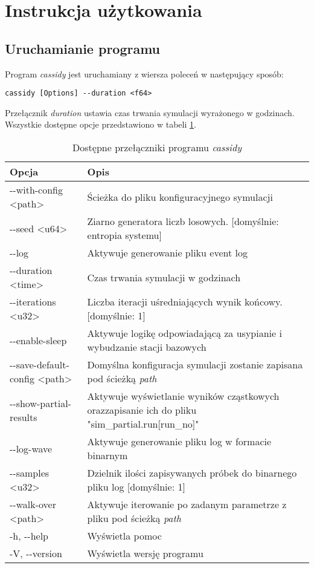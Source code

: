 \section{Instrukcja użytkowania}
\subsection{Uruchamianie programu}
Program \emph{cassidy} jest uruchamiany z wiersza poleceń w następujący sposób:
{
\selectfont 
\begin{verbatim}
cassidy [Options] --duration <f64>
\end{verbatim}
}

\noindent Przełącznik \emph{duration} ustawia czas trwania symulacji wyrażonego w godzinach. Wszystkie dostępne opcje przedstawiono w tabeli \ref{options_table}.
\newline\newline
\begin{table}[h]
\caption{Dostępne przełączniki programu \emph{cassidy}}
\label{options_table}
\begin{center}
\selectfont
\renewcommand{\arraystretch}{1.5}
\begin{tabular}{|l|p{}|}
\hline 
Opcja & Opis \\ 
\hline 
-{}-with-config <path> & Ścieżka do pliku konfiguracyjnego symulacji \\ 
\hline
-{}-seed <u64> & Ziarno generatora liczb losowych. [domyślnie: entropia systemu] \\
\hline
-{}-log & Aktywuje generowanie pliku event log \\
\hline
-{}-duration <time> & Czas trwania symulacji w godzinach \\
\hline
-{}-iterations <u32> & Liczba iteracji uśredniających wynik końcowy. [domyślnie: 1]\\
\hline
-{}-enable-sleep & Aktywuje logikę odpowiadającą za usypianie i wybudzanie stacji bazowych \\
\hline
-{}-save-default-config <path> & Domyślna konfiguracja symulacji zostanie zapisana pod ścieżką \emph{path} \\
\hline
-{}-show-partial-results & Aktywuje wyświetlanie wyników cząstkowych oraz\newline zapisanie ich do pliku "sim\_partial.run[run\_no]" \\
\hline
-{}-log-wave & Aktywuje generowanie pliku log w formacie binarnym \\
\hline
-{}-samples <u32> & Dzielnik ilości zapisywanych próbek do binarnego pliku log [domyślnie: 1] \\
\hline
-{}-walk-over <path> & Aktywuje iterowanie po zadanym parametrze z pliku pod ścieżką \emph{path} \\
\hline
-h, -{}-help & Wyświetla pomoc \\
\hline
-V, -{}-version & Wyświetla wersję programu  \\
\hline
\end{tabular}
\end{center}
\end{table}

